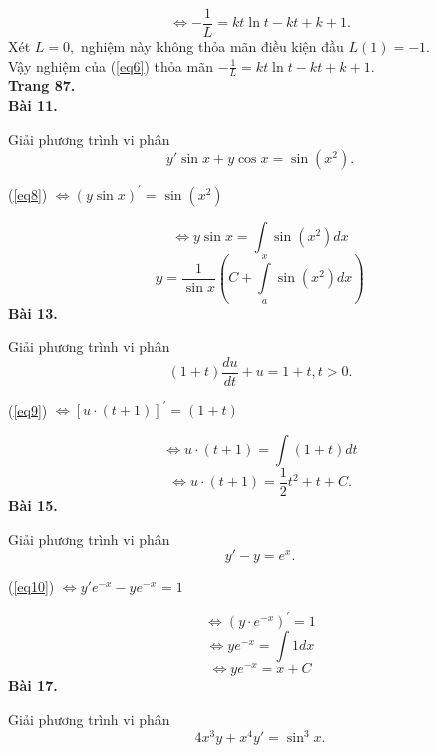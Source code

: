 \documentclass[12pt,a4paper]{article}
\begin{document}
\[ \Leftrightarrow  - \frac{1}{L} = kt\ln t - kt + k + 1.\]
Xét \(L = 0,\) nghiệm này không thỏa mãn điều kiện đầu \(L\left( 1 \right) =  - 1.\)\\
Vậy nghiệm của (\ref{eq6}) thỏa mãn \( - \frac{1}{L} = kt\ln t - kt + k + 1.\)\\
\textbf{Trang 87.}\\
\textbf{Bài 11.}
\begin{mybox}
Giải phương trình vi phân
\begin{equation}
y'\sin x + y\cos x = \sin \left( {{x^2}} \right).
\label{eq8}
\end{equation}
\end{mybox}
\begin{center}
(\ref{eq8}) \( \Leftrightarrow {\left( {y\sin x} \right)^\prime } = \sin \left( {{x^2}} \right)\)
\end{center}
\[ \Leftrightarrow y\sin x = \int {\sin \left( {{x^2}} \right)} dx\]
\[y = \frac{1}{{\sin x}}\left( {C + \int\limits_a^x {\sin \left( {{x^2}} \right)dx} } \right)\]
\textbf{Bài 13.}
\begin{mybox}
Giải phương trình vi phân
\begin{equation}
\left( {1 + t} \right)\frac{{du}}{{dt}} + u = 1 + t, t > 0.
\label{eq9}
\end{equation}
\end{mybox}
\begin{center}
(\ref{eq9}) \( \Leftrightarrow {\left[ {u \cdot \left( {t + 1} \right)} \right]^\prime } = \left( {1 + t} \right)\)
\end{center}
\[ \Leftrightarrow u \cdot \left( {t + 1} \right) = \int {\left( {1 + t} \right)dt} \]
\[ \Leftrightarrow u \cdot \left( {t + 1} \right) = \frac{1}{2}{t^2} + t + C.\]
\textbf{Bài 15.}
\begin{mybox}
Giải phương trình vi phân
\begin{equation}
y' - y = e^x.
\label{eq10}
\end{equation}
\end{mybox}
\begin{center}
(\ref{eq10}) \( \Leftrightarrow y'{e^{ - x}} - y{e^{ - x}} = 1\)
\end{center}
\[ \Leftrightarrow {\left( {y \cdot {e^{ - x}}} \right)^\prime } = 1\]
\[ \Leftrightarrow y{e^{ - x}} = \int {1dx} \]
\[ \Leftrightarrow y{e^{ - x}} = x + C\]
\textbf{Bài 17.}
\begin{mybox}
Giải phương trình vi phân
\begin{equation}
4{x^3}y + {x^4}y' = {\sin ^3}x.
\label{eq11}
\end{equation}
\end{mybox}
\end{document}
